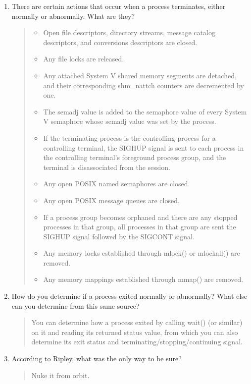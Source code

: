 \documentclass[letterpaper,10pt,onecolumn,titlepage]{article}
\begin{document}
\begin{enumerate}
\item There are certain actions that occur when a process terminates, either normally or abnormally. What are they?
\begin{quote}
\begin{itemize}
\item Open file descriptors, directory streams, message catalog descriptors, and conversions descriptors are closed.
\item Any file locks are released.
\item Any attached System V shared memory segments are detached, and their corresponding shm\_nattch counters are decremented by one.
\item The semadj value is added to the semaphore value of every System V semaphore whose semadj value was set by the process.
\item If the terminating process is the controlling process for a controlling terminal, the SIGHUP signal is sent to each process in the controlling terminal's foreground process group, and the terminal is disassociated from the session.
\item Any open POSIX named semaphores are closed.
\item Any open POSIX message queues are closed.
\item If a process group becomes orphaned and there are any stopped processes in that group, all processes in that group are sent the SIGHUP signal followed by the SIGCONT signal.
\item Any memory locks established through mlock() or mlockall() are removed.
\item Any memory mappings established through mmap() are removed.
\end{itemize}
\end{quote}

\item How do you determine if a process exited normally or abnormally? What else can you determine from this same source?
\begin{quote}
You can determine how a process exited by calling wait() (or similar) on it and reading its returned status value, from which you can also determine its exit status and terminating/stopping/continuing signal.
\end{quote}

\item According to Ripley, what was the only way to be sure?
\begin{quote}
Nuke it from orbit.
\end{quote}


\end{enumerate}
\end{document}

